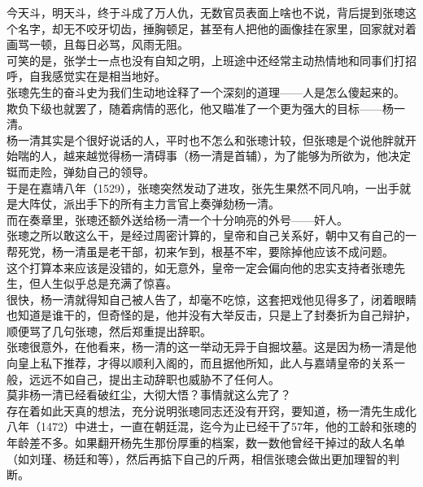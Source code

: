 \begin{multicols}{\theparacolNo}
今天斗，明天斗，终于斗成了万人仇，无数官员表面上啥也不说，背后提到张璁这个名字，却无不咬牙切齿，捶胸顿足，甚至有人把他的画像挂在家里，回家就对着画骂一顿，且每日必骂，风雨无阻。\\

可笑的是，张学士一点也没有自知之明，上班途中还经常主动热情地和同事们打招呼，自我感觉实在是相当地好。\\

张璁先生的奋斗史为我们生动地诠释了一个深刻的道理——人是怎么傻起来的。\\

欺负下级也就罢了，随着病情的恶化，他又瞄准了一个更为强大的目标——杨一清。\\

杨一清其实是个很好说话的人，平时也不怎么和张璁计较，但张璁是个说他胖就开始喘的人，越来越觉得杨一清碍事（杨一清是首辅），为了能够为所欲为，他决定铤而走险，弹劾自己的领导。\\

于是在嘉靖八年（1529），张璁突然发动了进攻，张先生果然不同凡响，一出手就是大阵仗，派出手下的所有主力言官上奏弹劾杨一清。\\

而在奏章里，张璁还额外送给杨一清一个十分响亮的外号——奸人。\\

张璁之所以敢这么干，是经过周密计算的，皇帝和自己关系好，朝中又有自己的一帮死党，杨一清虽是老干部，初来乍到，根基不牢，要除掉他应该不成问题。\\

这个打算本来应该是没错的，如无意外，皇帝一定会偏向他的忠实支持者张璁先生，但人生似乎总是充满了惊喜。\\

很快，杨一清就得知自己被人告了，却毫不吃惊，这套把戏他见得多了，闭着眼睛也知道是谁干的，但奇怪的是，他并没有大举反击，只是上了封奏折为自己辩护，顺便骂了几句张璁，然后郑重提出辞职。\\

张璁很意外，在他看来，杨一清的这一举动无异于自掘坟墓。这是因为杨一清是他向皇上私下推荐，才得以顺利入阁的，而且据他所知，此人与嘉靖皇帝的关系一般，远远不如自己，提出主动辞职也威胁不了任何人。\\

莫非杨一清已经看破红尘，大彻大悟？事情就这么完了？\\

存在着如此天真的想法，充分说明张璁同志还没有开窍，要知道，杨一清先生成化八年（1472）中进士，一直在朝廷混，迄今为止已经干了57年，他的工龄和张璁的年龄差不多。如果翻开杨先生那份厚重的档案，数一数他曾经干掉过的敌人名单（如刘瑾、杨廷和等），然后再掂下自己的斤两，相信张璁会做出更加理智的判断。\\


\end{multicols}
